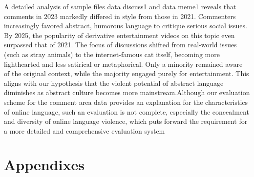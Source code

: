 \documentclass[12pt,a4paper]{ctexart}
\theoremstyle{MyLineTheoremStyle}
\theoremstyle{MyBlockTheoremStyle}
\theoremstyle{MySubsubsectionStyle}
\begin{document}
A detailed analysis of sample files data discuss1 and data meme1 reveals that comments in 2023 markedly differed in style from those in 2021. Commenters increasingly favored abstract, humorous language to critique serious social issues. By 2025, the popularity of derivative entertainment videos on this topic even surpassed that of 2021. The focus of discussions shifted from real-world issues (such as stray animals) to the internet-famous cat itself, becoming more lighthearted and less satirical or metaphorical. Only a minority remained aware of the original context, while the majority engaged purely for entertainment. This aligns with our hypothesis that the violent potential of abstract language diminishes as abstract culture becomes more mainstream.Although our evaluation scheme for the comment area data provides an explanation for the characteristics of online language, such an evaluation is not complete, especially the concealment and diversity of online language violence, which puts forward the requirement for a more detailed and comprehensive evaluation system

\section{Appendixes}

\begin{lstlisting}[language=python, style=MatlabStyle_src]

\end{lstlisting}
\end{document}
